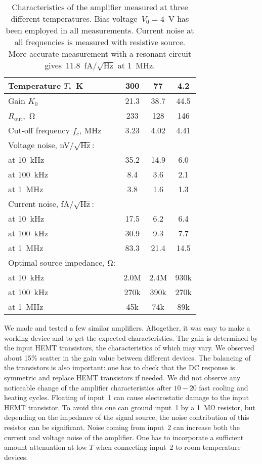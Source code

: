\documentclass{twocol}
\begin{document}
\begin{table}
\begin{tabular}{|l|c|c|c|}\hline
Temperature $T$,~K           & 300  & 77   & 4.2 \\\hline
Gain $K_0$                   & 21.3 & 38.7 & 44.5 \\
$R_{\mbox{out}}$,~$\mathrm{\Omega}$   & 233  & 128  & 146  \\
Cut-off frequency $f_c$, MHz & 3.23 & 4.02 & 4.41\\[5pt]
Voltage noise, nV/$\sqrt{\mbox{Hz}}:$&&&\\
at 10~kHz                    & 35.2 & 14.9 & 6.0 \\
at 100~kHz                   &  8.4 &  3.6 & 2.1 \\
at 1~MHz                     &  3.8 &  1.6 & 1.3 \\
Current noise, fA/$\sqrt{\mbox{Hz}}:$&&&\\
at 10~kHz                    & 17.5 &  6.2 &  6.4 \\
at 100~kHz                   & 30.9 &  9.3 &  7.7 \\
at 1~MHz                     & 83.3 & 21.4 & 14.5 \\
Optimal source impedance, $\mathrm{\Omega}$:&&&\\
at 10~kHz                    & 2.0M & 2.4M & 930k \\
at 100~kHz                   & 270k & 390k & 270k \\
at 1~MHz                     &  45k &  74k &  89k \\
\hline
\end{tabular}
\caption{Characteristics of the amplifier measured at three different
temperatures. Bias voltage~$V_0=4$~V has been  employed in all
measurements. Current noise at all frequencies is measured with resistive
source. More accurate measurement with a resonant circuit
gives~11.8~fA/$\sqrt{\mbox{Hz}}$ at 1~MHz.}
\label{table}
\end{table}

We made and tested a few similar amplifiers. Altogether, it was easy to make a
working device and to get the expected characteristics. The gain is determined by
the input HEMT transistors, the characteristics of which may vary. We observed about 15\% scatter in
the gain value between different devices. The balancing of the transistors is
also important: one has to check that the DC response is symmetric and
replace HEMT transistors if needed. We did not observe any noticeable
change of the amplifier characteristics after $10-20$ fast cooling and heating
cycles. Floating of input~1 can cause electrostatic damage to the input HEMT
transistor. To avoid this one can ground input~1 by a 1~M$\mathrm{\Omega}$ resistor,
but depending on the impedance of the signal source, the noise contribution of
this resistor can be significant. Noise coming from input~2 can increase
both the current and voltage noise of the amplifier. One has to incorporate a sufficient amount 
attenuation at low $T$ when connecting input~2 to room-temperature devices.
\end{document}

